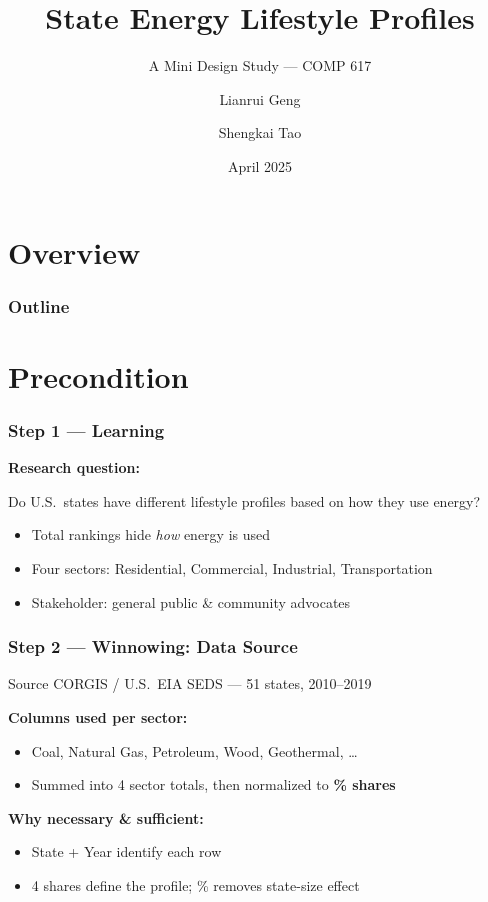 \documentclass{beamer}
\author{Lianrui Geng \and Shengkai Tao}
\title{State Energy Lifestyle Profiles}
\subtitle{A Mini Design Study --- COMP 617}
\date{April 2025}
\begin{document}
\section{Overview}
\begin{frame}
    \frametitle{Outline}
    \tableofcontents
\end{frame}


\section{Precondition}

\begin{frame}
    \frametitle{Step 1 --- Learning}

    \textbf{Research question:}

    \bigskip

    {\large Do U.S.\ states have different \alert{lifestyle profiles} based on how they use energy?}

    \bigskip
    \bigskip

    \begin{itemize}
        \item Total rankings hide \emph{how} energy is used
        \item Four sectors: Residential, Commercial, Industrial, Transportation
        \item Stakeholder: general public \& community advocates
    \end{itemize}
\end{frame}


\begin{frame}
    \frametitle{Step 2 --- Winnowing: Data Source}

    \begin{block}{Source}
        CORGIS / U.S.\ EIA SEDS --- 51 states, 2010--2019
    \end{block}

    \bigskip

    \textbf{Columns used per sector:}
    \begin{itemize}
        \item Coal, Natural Gas, Petroleum, Wood, Geothermal, \ldots
        \item Summed into 4 sector totals, then normalized to \textbf{\% shares}
    \end{itemize}

    \bigskip

    \textbf{Why necessary \& sufficient:}
    \begin{itemize}
        \item State + Year identify each row
        \item 4 shares define the profile; \% removes state-size effect
    \end{itemize}
\end{frame}
\end{document}
